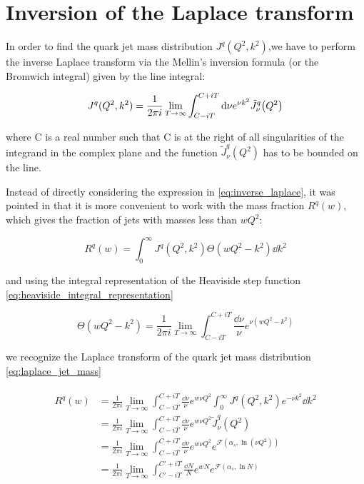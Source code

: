 \documentclass[../main.tex]{subfiles}
\begin{document}
\section{Inversion of the Laplace transform}

In order to find the quark jet mass distribution $J^q(Q^2,k^2)$,we have to perform the inverse Laplace transform via 
the Mellin's inversion formula (or the Bromwich integral) given by the line integral: 

\begin{equation} \label{eq:inverse_laplace}
    J^q(Q^2,k^2) = \frac{1}{2\pi i} \lim_{T \to \infty}\int_{C-iT}^{C+iT} \dd \nu e^{\nu k^2} \tilde{J}^q_\nu \qty(Q^2)
\end{equation}

where C is a real number such that C is at the right of all singularities of the integrand in the complex plane and
the function $\tilde{J}^q_\nu(Q^2)$ has to be bounded on the line.

Instead of directly considering the expression in \cref{eq:inverse_laplace}, it was pointed in \cite{CATANI19933} that 
it is more convenient to work with the mass fraction $R^q(w)$, which gives the fraction of jets with masses less than $wQ^2$:

\begin{equation}\label{eq:jet mass fraction}
    R^q(w) = \int_0^\infty J^q(Q^2,k^2)\Theta(wQ^2-k^2) \dd k^2
\end{equation}

and using the integral representation of the Heaviside step function \cref{eq:heaviside_integral_representation}

\begin{equation}
    \Theta(wQ^2-k^2) = \frac{1}{2\pi i} \lim_{T \to \infty}\int_{C-iT}^{C+iT} \frac{\dd \nu}{\nu} e^{\nu (wQ^2-k^2)} 
\end{equation}

we recognize the Laplace transform of the quark jet mass distribution \cref{eq:laplace_jet_mass}

\begin{align}
    \begin{split}\label{eq:Rw mass fraction}
        R^q(w) &= \frac{1}{2\pi i} \lim_{T \to \infty} \int_{C-iT}^{C+iT} \frac{\dd \nu}{\nu} e^{w \nu Q^2} \int_0^\infty J^q(Q^2,k^2) e^{-\nu k^2} \dd k^2 \\
        &= \frac{1}{2\pi i} \lim_{T \to \infty} \int_{C-iT}^{C+iT} \frac{\dd \nu}{\nu} e^{w \nu Q^2} \tilde{J}^q_\nu(Q^2) \\
        &= \frac{1}{2\pi i} \lim_{T \to \infty} \int_{C-iT}^{C+iT} \frac{\dd \nu}{\nu} e^{w \nu Q^2} e^{\mathcal{F}(\alpha_s,\ln(\nu Q^2))}\\
        &= \frac{1}{2\pi i} \lim_{T \to \infty} \int_{C'-iT}^{C'+iT} \frac{\dd N}{N} e^{w N} e^{\mathcal{F}(\alpha_s,\ln N)}
    \end{split}
\end{align}
\end{document}
